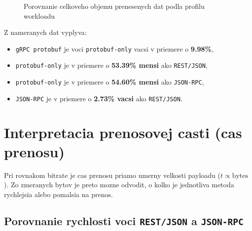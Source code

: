 \documentclass[12pt,a4paper]{report}
\begin{document}
\begin{figure}[htbp]
\centering
{}
\caption{Porovnanie celkoveho objemu prenesenych dat podla profilu workloadu}
\label{fig:transport-bytes-profile}
\end{figure}

Z nameranych dat vyplyva:
\begin{itemize}
  \item \texttt{gRPC protobuf} je voci \texttt{protobuf-only} vacsi
  v priemere o \textbf{9.98\%},
  \item \texttt{protobuf-only} je v priemere o \textbf{53.39\% mensi}
  ako \texttt{REST/JSON},
  \item \texttt{protobuf-only} je v priemere o \textbf{54.60\% mensi}
  ako \texttt{JSON-RPC},
  \item \texttt{JSON-RPC} je v priemere o \textbf{2.73\% vacsi}
  ako \texttt{REST/JSON}.
\end{itemize}

\section{Interpretacia prenosovej casti (cas prenosu)}

Pri rovnakom bitrate je cas prenosu priamo umerny velkosti payloadu
($t \propto \text{bytes}$). Zo zmeranych bytov je preto mozne odvodit,
o kolko je jednotliva metoda rychlejsia alebo pomalsia na prenos.

\subsection{Porovnanie rychlosti voci \texttt{REST/JSON} a \texttt{JSON-RPC}}
\end{document}

